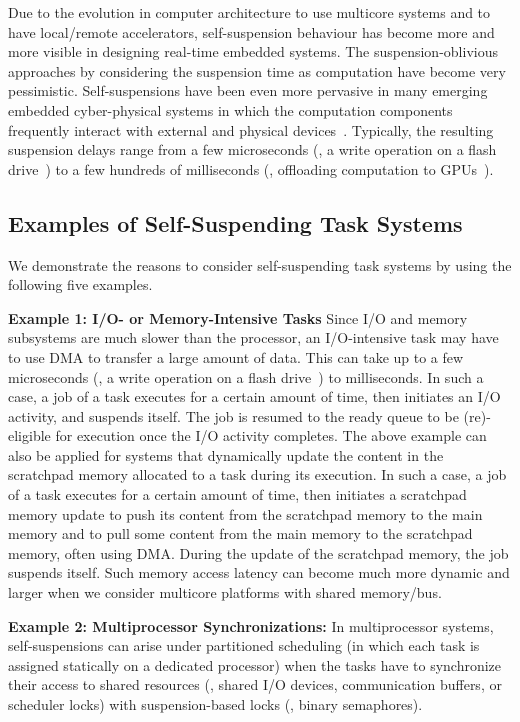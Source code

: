 Due to the evolution in computer architecture to use multicore systems and to have local/remote accelerators, self-suspension behaviour has become more and more visible in designing real-time embedded systems.  The suspension-oblivious approaches by considering the suspension time as computation have become very pessimistic. Self-suspensions have been even more pervasive in many emerging embedded cyber-physical systems in which the computation components frequently interact with external and physical devices~\cite{Kang:rtss07,Kato_2011}.  Typically, the resulting suspension delays range from a few microseconds (\eg, a write operation on a flash drive~\cite{Kang:rtss07}) to a few hundreds of milliseconds (\eg, offloading computation to GPUs~\cite{Kato_2011,Liu_2014}).

\subsection{Examples of Self-Suspending Task Systems}
\label{sec:examples}

We demonstrate the reasons to consider self-suspending task systems by using the following five examples.

{\bf Example 1: I/O- or Memory-Intensive Tasks} Since I/O and memory subsystems are much slower than the processor, an I/O-intensive task may have to use DMA to transfer a large amount of data. This can take up to a few microseconds (\eg, a write operation on a flash drive~\cite{Kang:rtss07}) to milliseconds. In such a case, a job of a task executes for a certain amount of time, then initiates an I/O activity, and suspends itself. The job is resumed to the ready queue to be (re)-eligible for execution once the I/O activity completes. The above example can also be applied for systems that dynamically update the content in the scratchpad memory allocated to a task during its execution. In such a case, a job of a task executes for a certain amount of time, then initiates a scratchpad memory update to push its content from the scratchpad memory to the main memory and to pull some content from the main memory to the scratchpad memory, often using DMA. During the update of the scratchpad memory, the job suspends itself. Such memory access latency can become much more dynamic and larger when we consider multicore platforms with shared memory/bus.

{\bf Example 2: Multiprocessor Synchronizations:} \hspace{0.1in}
In multiprocessor systems, self-suspensions can arise under partitioned scheduling (in which each task is assigned statically on a dedicated processor) when the tasks have to synchronize their access to shared resources (\eg, shared I/O devices, communication buffers, or scheduler locks) with suspension-based locks (\eg, binary semaphores). 

